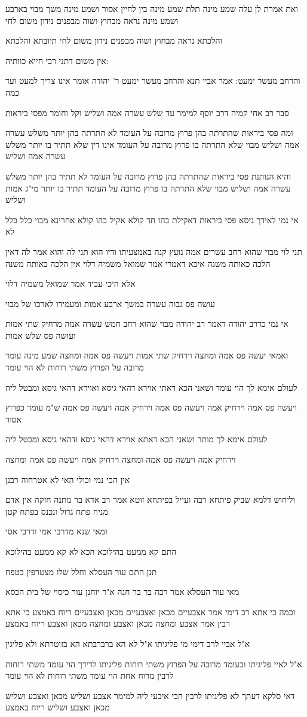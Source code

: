 \documentclass[12pt, openany]{book}
\newcommand{\sethebfont}{
\fontsize{10.5pt}{21.0pt} \selectfont
}
\newcommand{\textblock}[1]{
{\sethebfont #1\\}	
}
\begin{document}
\textblock{ואת אמרת לן עלה שמע מינה תלת שמע מינה בין לחיין אסור ושמע מינה משך מבוי בארבע ושמע מינה נראה מבחוץ ושוה מבפנים נידון משום לחי}
\textblock{והלכתא נראה מבחוץ ושוה מבפנים נידון משום לחי תיובתא והלכתא}
\textblock{אין משום דתני רבי חייא כוותיה:}
\textblock{והרחב מעשר ימעט: אמר אביי תנא והרחב מעשר ימעט ר' יהודה אומר אינו צריך למעט ועד כמה}
\textblock{סבר רב אחי קמיה דרב יוסף למימר עד שלש עשרה אמה ושליש וקל וחומר מפסי ביראות}
\textblock{ומה פסי ביראות שהתרתה בהן פרוץ מרובה על העומד לא התרתה בהן יותר משלש עשרה אמה ושליש מבוי שלא התרתה בו פרוץ מרובה על העומד אינו דין שלא תתיר בו יותר משלש עשרה אמה ושליש}
\textblock{והיא הנותנת פסי ביראות שהתרתה בהן פרוץ מרובה על העומד לא תתיר בהן יותר משלש עשרה אמה ושליש מבוי שלא התרתה בו פרוץ מרובה על העומד תתיר בו יותר מי"ג אמות ושליש}
\textblock{אי נמי לאידך גיסא פסי ביראות דאקילת בהו חד קולא אקיל בהו קולא אחרינא מבוי כלל כלל לא}
\textblock{תני לוי מבוי שהוא רחב עשרים אמה נועץ קנה באמצעיתו ודיו הוא תני לה והוא אמר לה דאין הלכה כאותה משנה איכא דאמרי אמר שמואל משמיה דלוי אין הלכה כאותה משנה}
\textblock{אלא היכי עביד אמר שמואל משמיה דלוי}
\textblock{עושה פס גבוה עשרה במשך ארבע אמות ומעמידו לארכו של מבוי}
\textblock{אי נמי כדרב יהודה דאמר רב יהודה מבוי שהוא רחב חמש עשרה אמה מרחיק שתי אמות ועושה פס שלש אמות}
\textblock{ואמאי יעשה פס אמה ומחצה וירחיק שתי אמות ויעשה פס אמה ומחצה שמע מינה עומד מרובה על הפרוץ משתי רוחות לא הוי עומד}
\textblock{לעולם אימא לך הוי עומד ושאני הכא דאתי אוירא דהאי גיסא ואוירא דהאי גיסא ומבטל ליה}
\textblock{ויעשה פס אמה וירחיק אמה ויעשה פס אמה וירחיק אמה ויעשה פס אמה ש"מ עומד כפרוץ אסור}
\textblock{לעולם אימא לך מותר ושאני הכא דאתא אוירא דהאי גיסא ודהאי גיסא ומבטל ליה}
\textblock{וירחיק אמה ויעשה פס אמה ומחצה וירחיק אמה ויעשה פס אמה ומחצה}
\textblock{אין הכי נמי וכולי האי לא אטרחוה רבנן}
\textblock{וליחוש דלמא שביק פיתחא רבה ועייל בפיתחא זוטא אמר רב אדא בר מתנה חזקה אין אדם מניח פתח גדול ונכנס בפתח קטן}
\textblock{ומאי שנא מדרבי אמי ודרבי אסי}
\textblock{התם קא ממעט בהילוכא הכא לא קא ממעט בהילוכא}
\textblock{תנן התם עור העסלא וחלל שלו מצטרפין בטפח}
\textblock{מאי עור העסלא אמר רבה בר בר חנה א"ר יוחנן עור כיסוי של בית הכסא}
\textblock{וכמה כי אתא רב דימי אמר אצבעיים מכאן ואצבעיים מכאן ואצבעיים ריוח באמצע כי אתא רבין אמר אצבע ומחצה מכאן ואצבע ומחצה מכאן ואצבע ריוח באמצע}
\textblock{א"ל אביי לרב דימי מי פליגיתו א"ל לא הא ברברבתא הא בזוטרתא ולא פליגין}
\textblock{א"ל לאיי פליגיתו ובעומד מרובה על הפרוץ משתי רוחות פליגיתו לדידך הוי עומד משתי רוחות לרבין מרוח אחת הוי עומד משתי רוחות לא הוי עומד}
\textblock{דאי סלקא דעתך לא פליגיתו לרבין הכי איבעי ליה למימר אצבע ושליש מכאן ואצבע ושליש מכאן ואצבע ושליש ריוח באמצע}
\end{document}
